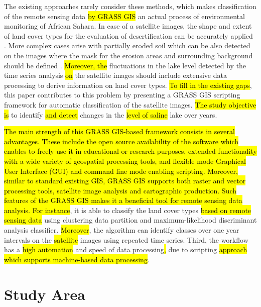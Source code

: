 \documentclass[asi,article,submit,pdftex,moreauthors]{Definitions/mdpi}
\begin{document}
The existing approaches rarely consider these methods, which makes classification of the remote sensing data \hl{by GRASS GIS }an actual process of environmental monitoring of African Sahara. In case of a satellite images, the shape and extent of land cover types for the evaluation of desertification can be\hl{ }accurately applied \cite{oussedik2003realisation}. More complex cases arise with partially eroded soil which can be also detected on the images where the mask for the erosion areas and surrounding background should be defined \cite{Toumietal}. \hl{Moreover, the} fluctuations in the lake level detected by the time series analysis \hl{on} the satellite images should include extensive data processing to derive information on land cover types. \hl{To fill in the existing gaps}, this paper contributes to this problem by presenting a GRASS GIS scripting framework for automatic classification of the satellite images. \hl{The study objective is }to identify \hl{and detect }changes in the \hl{level of saline }lake over years.

\hl{The main strength of this GRASS GIS-based framework consists in several advantages. These include the open source availability of the software which enables to freely use it in educational or research purposes, extended functionality with a wide variety of geospatial processing tools, and flexible mode Graphical User Interface (GUI) and command line mode enabling scripting. Moreover, similar to standard existing GIS, GRASS GIS supports both raster and vector processing tools, satellite image analysis and cartographic production. Such features of the GRASS GIS makes it a beneficial tool for remote sensing data analysis. For instance}, it is able to classify the land cover types \hl{based on remote sensing data }using clustering data partition and maximum-likelihood discriminant analysis classifier. \hl{Moreover}, the algorithm can identify classes over one year intervals on the \hl{satellite }images using repeated time series. Third, the workflow has a \hl{high automation} and speed of data processing\hl{, }due to scripting \hl{approach which supports machine-based data processing}.

\section{Study Area}
\end{document}
